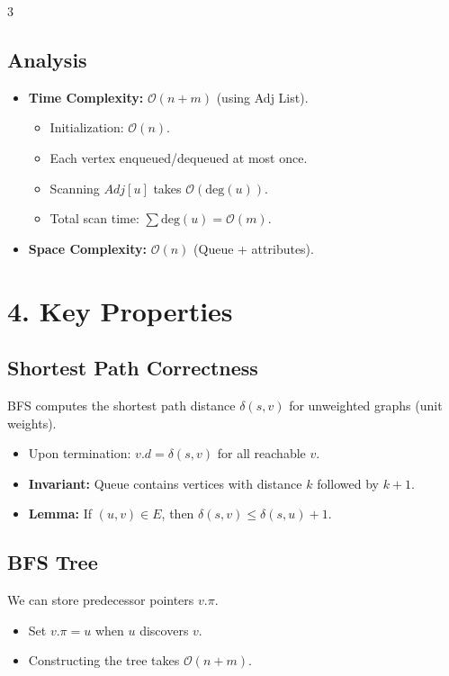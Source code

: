 \documentclass[10pt, a4paper, landscape]{article}
\newcommand{\bigO}{\mathcal{O}}
\begin{document}
\begin{multicols*}{3}
\subsection*{Analysis}
\begin{itemize}
    \item \textbf{Time Complexity:} $\bigO(n + m)$ (using Adj List).
        \begin{itemize}
            \item Initialization: $\bigO(n)$.
            \item Each vertex enqueued/dequeued at most once.
            \item Scanning $Adj[u]$ takes $\bigO(\text{deg}(u))$.
            \item Total scan time: $\sum \text{deg}(u) = \bigO(m)$.
        \end{itemize}
    \item \textbf{Space Complexity:} $\bigO(n)$ (Queue + attributes).
\end{itemize}

\section{4. Key Properties}

\subsection*{Shortest Path Correctness}
BFS computes the shortest path distance $\delta(s, v)$ for unweighted graphs (unit weights).
\begin{itemize}
    \item Upon termination: $v.d = \delta(s, v)$ for all reachable $v$.
    \item \textbf{Invariant:} Queue contains vertices with distance $k$ followed by $k+1$.
    \item \textbf{Lemma:} If $(u, v) \in E$, then $\delta(s, v) \le \delta(s, u) + 1$.
\end{itemize}

\subsection*{BFS Tree}
We can store predecessor pointers $v.\pi$.
\begin{itemize}
    \item Set $v.\pi = u$ when $u$ discovers $v$.
    \item Constructing the tree takes $\bigO(n+m)$.
\end{itemize}


\end{multicols*}
\end{document}

